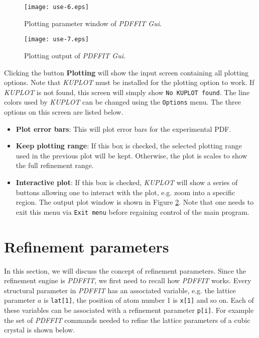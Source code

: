 \begin{figure}[!t]
   \centering
   \texttt{[image: use-6.eps]}
   \caption{Plotting parameter window of {\it PDFFIT Gui}.}
   \label{fig_use6}
\end{figure}

\begin{figure}[!t]
   \centering
   \texttt{[image: use-7.eps]}
   \caption{Plotting output of {\it PDFFIT Gui}.}
   \label{fig_use7}
\end{figure}

Clicking the button {\bf Plotting} will show the input screen
containing all plotting options. Note that {\it KUPLOT} must be
installed for the plotting option to work. If {\it KUPLOT} is not
found, this screen will simply show {\tt No KUPLOT found}. The line
colors used by {\it KUPLOT} can be changed using the {\tt Options}
menu. The three options on this screen are listed below.

\begin{itemize}
  \item \textbf{Plot error bars}: This will plot error bars for the
  experimental PDF.

  \item \textbf{Keep plotting range}: If this box is checked, the
  selected plotting range used in the previous plot will be kept.
  Otherwise, the plot is scales to show the full refinement range.

  \item \textbf{Interactive plot}: If this box is checked, {\it
  KUPLOT} will show a series of buttons allowing one to interact
  with the plot, e.g. zoom into a specific region. The output plot
  window is shown in Figure \ref{fig_use7}. Note that one needs to
  exit this menu via {\tt Exit menu} before regaining control of the
  main program.
\end{itemize}


\section{Refinement parameters \label{par}}

In this section, we will discuss the concept of refinement
parameters. Since the refinement engine is {\it PDFFIT}, we first
need to recall how {\it PDFFIT} works. Every structural parameter in
{\it PDFFIT} has an associated variable, e.g. the lattice parameter
$a$ is {\tt lat[1]}, the position of atom number 1 is {\tt x[1]} and
so on. Each of these variables can be associated with a refinement
parameter {\tt p[i]}. For example the set of {\it PDFFIT} commands
needed to refine the lattice parameters of a cubic crystal is shown
below.

